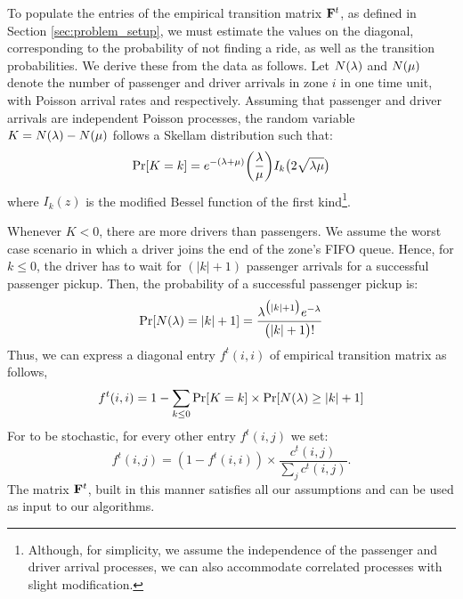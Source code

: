 To populate the entries of the empirical transition matrix ${\mathbf{F}}^t$, as 
  defined in Section \ref{sec:problem_setup}, we must estimate the values on the diagonal, 
  corresponding to the probability of not finding a ride, as well as the transition probabilities.
We derive these from the data as follows.
Let $N(\lambda)$ and $N(\mu)$ denote the number of passenger and driver arrivals in zone $i$ in one time unit, with Poisson arrival rates {\passengerarrivalrate} and {\driverarrivalrate} respectively. Assuming that passenger and driver arrivals are independent Poisson processes, the random variable $K = N(\lambda) - N(\mu)$ follows a Skellam distribution 
such that:
\begin{equation*}
\Pr[K=k] = e^{-(\lambda + \mu)} \bigg(\frac{\lambda}{\mu}\bigg) I_k\big(2 \sqrt{\lambda \mu}\big)
\end{equation*}
where $I_k(z)$ is the modified Bessel function of the first kind\footnote{Although, for simplicity, we assume the independence of the passenger and driver arrival processes, we can also accommodate correlated processes with slight modification.}.

Whenever %
$K<0$, there are more drivers than passengers. We assume the worst case scenario in which a driver joins the end
 of the zone's FIFO queue. Hence, for $k \leq 0$, the driver has to wait for $(|k| + 1)$ passenger arrivals for a successful passenger pickup. Then, the probability of a successful passenger pickup is:
\begin{equation*}
\Pr[N(\lambda) = |k| + 1] = \frac{\lambda^{\big(|k|+1\big)} e^{-\lambda}}{\big(|k| + 1\big)!}
\end{equation*}
Thus, we can express a diagonal entry $f^t(i,i)$ of empirical transition matrix as follows,
\begin{equation*}
f^t(i,i) = 1 - \sum_{k \leq 0} \Pr[K = k] \times \Pr[N(\lambda) \geq |k| + 1]
\end{equation*}
For {\empiricaltransitionmatrix} to be stochastic, for every other entry 
$f^t(i,j)$ we set:
\begin{equation*}
f^t(i,j) = (1 - f^t(i,i)) \times \frac{c^t(i,j)}{\sum_{j}c^t(i,j)}. 
\end{equation*}
The matrix ${\mathbf{F}}^t$, built in this manner satisfies all our assumptions and can be used as input to our algorithms. 


